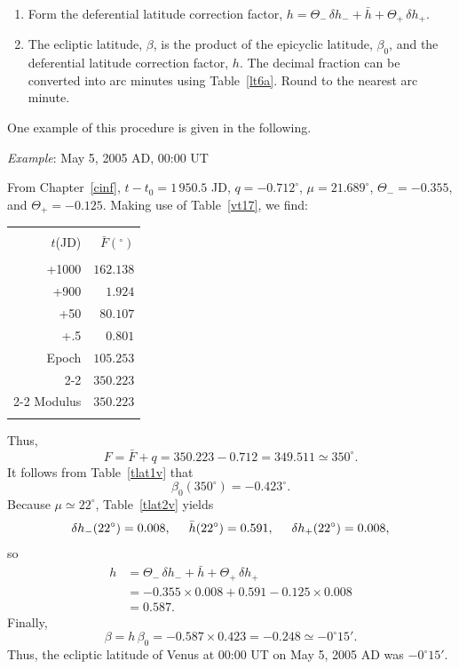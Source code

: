 \begin{enumerate}
\item Form the deferential latitude correction factor, $h = \Theta_-\,\delta h_-+ \bar{h}
+ \Theta_+\,\delta h_+$.

\item The ecliptic latitude, $\beta$, is the product of the epicyclic latitude, 
$\beta_0$,  and the deferential latitude correction factor, $h$.  The decimal fraction can
be converted into arc minutes
using Table~\ref{lt6a}. Round to the nearest arc minute. 
\end{enumerate}
One example of this procedure is given in the following.

\begin{center}
{\em Example}: May 5, 2005 AD, 00:00 UT
\end{center}
From Chapter~\ref{cinf}, $t-t_0=1\,950.5$ JD, 
$q= -0.712^\circ$,  $\mu= 21.689^\circ$, $\Theta_-=-0.355$, and
$\Theta_+ = -0.125$.
 Making use of
Table~\ref{vt17}, we find:
\begin{center}
\begin{tabular}{rr}
&\\
$t$(JD) & $\bar{F}(^\circ)$\\[-2ex]
&\\
+1000 & $162.138$ \\
+900 & $1.924$\\
+50 & $80.107$ \\
+.5 & $0.801$\\
Epoch & $105.253$ \\\cline{2-2}
&$350.223$ \\\cline{2-2}
Modulus & $350.223$ \\ 
&\\
\end{tabular}
\end{center}
Thus,
$$
F = \bar{F} + q = 350.223-0.712 = 349.511\simeq 350^\circ.
$$
It follows from Table~\ref{tlat1v} that
$$
\beta_0(350^\circ) = -0.423^\circ.
$$
Because  $\mu\simeq 22^\circ$, Table~\ref{tlat2v} yields
$$
\delta h_-(22^\circ) = 0.008,\mbox{\hspace{0.5cm}}\bar{h}(22^\circ)=0.591, \mbox{\hspace{0.5cm}}\delta h_+(22^\circ) = 0.008,
$$
so
\begin{align*}
h &= \Theta_-\,\delta h_- + \bar{h}+\Theta_+\,\delta h_+\\[0.5ex]
& = -0.355\times 0.008+0.591-0.125\times 0.008\\[0.5ex]
& = 0.587.
\end{align*}
Finally,
$$
\beta = h\,\beta_0 =- 0.587\times 0.423 = -0.248\simeq -0^\circ 15'.
$$
Thus,
the ecliptic latitude of Venus at 00:00 UT on May 5, 2005 AD was $-0^\circ 15'$.

